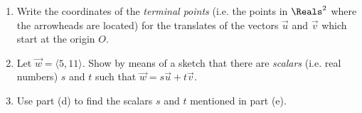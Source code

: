 \documentclass[12pt]{article}
\newcommand{\ti}[1]{\textit{#1}}
\begin{document}
\begin{enumerate}[resume]
\begin{enumerate}[itemsep=0.4in]
		\item Write the coordinates of the \ti{terminal points} (i.e. the points in $\Reals^2$ where the arrowheads are located) for the translates of the vectors $\vec{u}$ and $\vec{v}$ which start at the origin $O$.
		\item Let $\vec{w}=\langle 5,11\rangle$. Show by means of a sketch that there are \ti{scalars} (i.e. real numbers) $s$ and $t$ such that $\vec{w}=s\vec{u}+t\vec{v}$.
		\item Use part (d) to find the scalars $s$ and $t$ mentioned in part (e).%
	\end{enumerate}
\end{enumerate}
\end{document}
